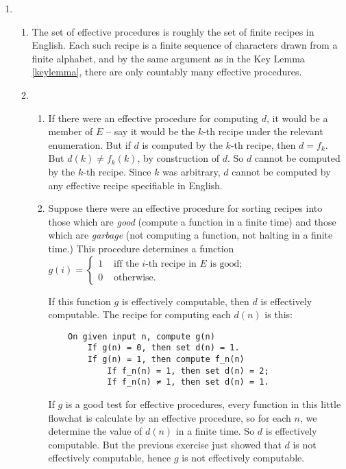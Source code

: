 {\begin{enumerate}
\begin{enumerate}
\begin{itemize}
		\item  $G\widetilde{D}$ contains elements only from $\widetilde{\Delta}$. Then every structure makes some member of $\Delta$ true whose negation is in $G\widetilde{D}$. Let $\Psi$ be the disjunction of negations of every sentence in $G\widetilde{D}$; this is a finite tautologous disjunction. Let $\Phi$ be an arbitrary finite conjunction of members from $\Gamma$. Since $\Psi$ is a tautology, $\Phi\vDash \Psi$.
	\end{itemize}
\end{enumerate}
\item \begin{enumerate}
	\item The set of effective procedures is roughly the set of finite recipes in English. Each such recipe is a finite sequence of characters drawn from a finite alphabet, and by the same argument as in the Key Lemma \ref{keylemma}, there are only countably many effective procedures.
	\item \begin{enumerate}
		\item If there were an effective procedure for computing $d$, it would be a member of $E$ – say it would be the $k$-th recipe under the relevant enumeration. But if $d$ is computed by the $k$-th recipe, then $d=f_{k}$. But $d(k) ≠ f_{k}(k)$, by construction of $d$. So $d$ cannot be computed by the $k$-th recipe. Since $k$ was arbitrary, $d$ cannot be computed by any effective recipe specifiable in English.
		\item Suppose there were an effective procedure for sorting recipes into those which are \emph{good} (compute a function in a finite time) and those which are \emph{garbage} (not computing a function, not halting in a finite time.) This procedure determines a function $g(i) = \begin{cases}
			1 &\text{ iff the $i$-th recipe in $E$ is good;}\\
			0 &\text{ otherwise}.
		\end{cases}$ 

If this function $g$ is effectively computable, then $d$ is effectively computable. The recipe for computing each $d(n)$ is this: \begin{verbatim}
    On given input n, compute g(n) 
        If g(n) = 0, then set d(n) = 1. 
        If g(n) = 1, then compute f_n(n)
            If f_n(n) = 1, then set d(n) = 2;
            If f_n(n) ≠ 1, then set d(n) = 1.
\end{verbatim} 
If $g$ is a good test for effective procedures, every function in this little flowchat is calculate by an effective procedure, so for each $n$, we determine the value of $d(n)$ in a finite time. So $d$ is effectively computable. But the previous exercise just showed that $d$ is not effectively computable, hence $g$ is not effectively computable.

	\end{enumerate}
\end{enumerate}
\end{enumerate}

}